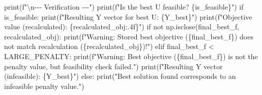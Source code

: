 \documentclass[
  letterpaper,
  DIV=11,
  numbers=noendperiod]{scrartcl}
\newenvironment{Shaded}{\begin{snugshade}}{\end{snugshade}}
\newcommand{\BuiltInTok}[1]{\textcolor[rgb]{0.00,0.23,0.31}{#1}}
\newcommand{\CharTok}[1]{\textcolor[rgb]{0.13,0.47,0.30}{#1}}
\newcommand{\ControlFlowTok}[1]{\textcolor[rgb]{0.00,0.23,0.31}{#1}}
\newcommand{\KeywordTok}[1]{\textcolor[rgb]{0.00,0.23,0.31}{#1}}
\newcommand{\NormalTok}[1]{\textcolor[rgb]{0.00,0.23,0.31}{#1}}
\newcommand{\OperatorTok}[1]{\textcolor[rgb]{0.37,0.37,0.37}{#1}}
\newcommand{\SpecialCharTok}[1]{\textcolor[rgb]{0.37,0.37,0.37}{#1}}
\newcommand{\SpecialStringTok}[1]{\textcolor[rgb]{0.13,0.47,0.30}{#1}}
\newcommand{\StringTok}[1]{\textcolor[rgb]{0.13,0.47,0.30}{#1}}
\begin{document}
\begin{Shaded}
\begin{Highlighting}[]
    \BuiltInTok{print}\NormalTok{(}\SpecialStringTok{f"}\CharTok{\textbackslash{}n}\SpecialStringTok{{-}{-}{-} Verification {-}{-}{-}"}\NormalTok{)}
    \BuiltInTok{print}\NormalTok{(}\SpecialStringTok{f"Is the best U feasible? }\SpecialCharTok{\{}\NormalTok{is\_feasible}\SpecialCharTok{\}}\SpecialStringTok{"}\NormalTok{)}
    \ControlFlowTok{if}\NormalTok{ is\_feasible:}
        \BuiltInTok{print}\NormalTok{(}\SpecialStringTok{f"Resulting Y vector for best U: }\SpecialCharTok{\{}\NormalTok{Y\_best}\SpecialCharTok{\}}\SpecialStringTok{"}\NormalTok{)}
        \BuiltInTok{print}\NormalTok{(}\SpecialStringTok{f"Objective value (recalculated): }\SpecialCharTok{\{}\NormalTok{recalculated\_obj}\SpecialCharTok{:.4f\}}\SpecialStringTok{"}\NormalTok{)}
        \ControlFlowTok{if} \KeywordTok{not}\NormalTok{ np.isclose(final\_best\_f, recalculated\_obj):}
             \BuiltInTok{print}\NormalTok{(}\SpecialStringTok{f"Warning: Stored best objective (}\SpecialCharTok{\{}\NormalTok{final\_best\_f}\SpecialCharTok{\}}\SpecialStringTok{) does not match recalculation (}\SpecialCharTok{\{}\NormalTok{recalculated\_obj}\SpecialCharTok{\}}\SpecialStringTok{)!"}\NormalTok{)}
    \ControlFlowTok{elif}\NormalTok{ final\_best\_f }\OperatorTok{\textless{}}\NormalTok{ LARGE\_PENALTY:}
         \BuiltInTok{print}\NormalTok{(}\SpecialStringTok{f"Warning: Best objective (}\SpecialCharTok{\{}\NormalTok{final\_best\_f}\SpecialCharTok{\}}\SpecialStringTok{) is not the penalty value, but feasibility check failed."}\NormalTok{)}
         \BuiltInTok{print}\NormalTok{(}\SpecialStringTok{f"Resulting Y vector (infeasible): }\SpecialCharTok{\{}\NormalTok{Y\_best}\SpecialCharTok{\}}\SpecialStringTok{"}\NormalTok{)}
    \ControlFlowTok{else}\NormalTok{:}
         \BuiltInTok{print}\NormalTok{(}\StringTok{"Best solution found corresponds to an infeasible penalty value."}\NormalTok{)}
\end{Highlighting}
\end{Shaded}
\end{document}
